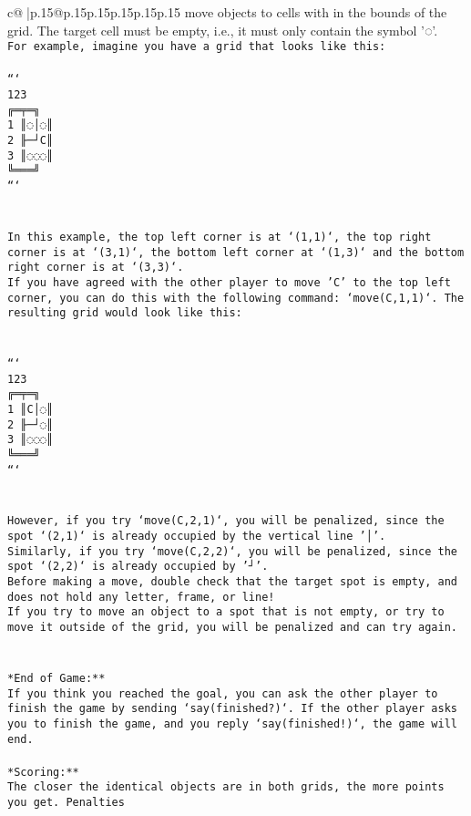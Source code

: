 \documentclass{article}
\begin{document}
{\begin{supertabular}{c@{$\;$}|p{.15\linewidth}@{}p{.15\linewidth}p{.15\linewidth}p{.15\linewidth}p{.15\linewidth}p{.15\linewidth}}
{{{move objects to cells with in the bounds of the grid. The target cell must be empty, i.e., it must only contain the symbol '◌'.\\ \tt * For example, imagine you have a grid that looks like this: \\ \tt \\ \tt ```\\ \tt     123\\ \tt    ╔═╤═╗\\ \tt  1 ║◌│◌║\\ \tt  2 ╟─┘C║\\ \tt  3 ║◌◌◌║\\ \tt    ╚═══╝\\ \tt ```\\ \tt \\ \tt \\ \tt * In this example, the top left corner is at `(1,1)`, the top right corner is at `(3,1)`, the bottom left corner at `(1,3)` and the bottom right corner is at `(3,3)`.\\ \tt * If you have agreed with the other player to move 'C' to the top left corner, you can do this with the following command: `move(C,1,1)`. The resulting grid would look like this: \\ \tt \\ \tt \\ \tt ```\\ \tt     123\\ \tt    ╔═╤═╗\\ \tt  1 ║C│◌║\\ \tt  2 ╟─┘◌║\\ \tt  3 ║◌◌◌║\\ \tt    ╚═══╝\\ \tt ```\\ \tt \\ \tt \\ \tt * However, if you try `move(C,2,1)`, you will be penalized, since the spot `(2,1)` is already occupied by the vertical line '│'.\\ \tt * Similarly, if you try `move(C,2,2)`, you will be penalized, since the spot `(2,2)` is already occupied by '┘'.\\ \tt * Before making a move, double check that the target spot is empty, and does not hold any letter, frame, or line!\\ \tt * If you try to move an object to a spot that is not empty, or try to move it outside of the grid, you will be penalized and can try again.\\ \tt \\ \tt \\ \tt **End of Game:**\\ \tt If you think you reached the goal, you can ask the other player to finish the game by sending `say(finished?)`. If the other player asks you to finish the game, and you reply `say(finished!)`, the game will end.\\ \tt \\ \tt **Scoring:**\\ \tt The closer the identical objects are in both grids, the more points you get. Penalties }}}
\end{supertabular}}
\end{document}
